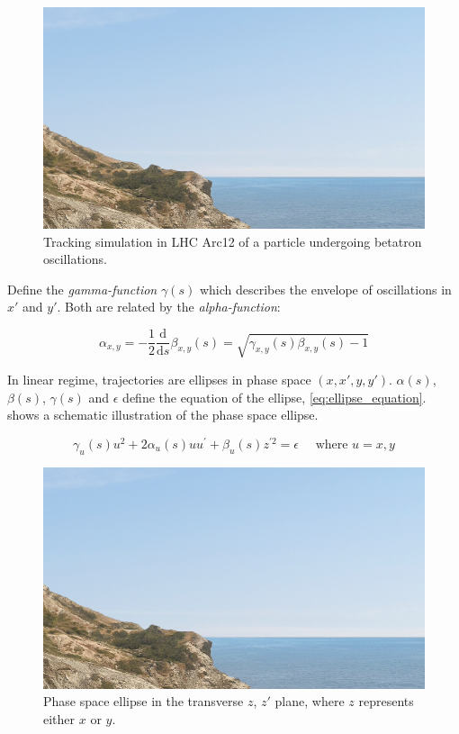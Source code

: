 \begin{figure}[!htb]
    \begin{center}
    \includegraphics[width = 0.7\linewidth]{Figures/placeholder.png}
    \caption{Tracking simulation in LHC Arc12 of a particle undergoing betatron oscillations.}
    \label{figure:particle_trajectories}
    \end{center}
\end{figure}

Define the \emph{gamma-function} $\gamma(s)$ which describes the envelope of oscillations in $x\prime$ and $y\prime$.
Both are related by the \emph{alpha-function}:
\bigbreak

\begin{equation}
    \alpha_{x, y} = -\frac{1}{2} \frac{\mathrm{d}}{\mathrm{d}s} \beta_{x, y}(s) = \sqrt{\gamma_{x, y}(s) \beta_{x, y}(s) - 1}
    \label{eq:alpha_function}
\end{equation}
\bigbreak

In linear regime, trajectories are ellipses in phase space $(x, x\prime, y, y\prime)$.
$\alpha(s)$, $\beta(s)$, $\gamma(s)$ and $\epsilon$ define the equation of the ellipse, \cref{eq:ellipse_equation}.
 shows a schematic illustration of the phase space ellipse.
\bigbreak

\begin{equation}
    \gamma_{u}(s) u^{2} + 2 \alpha_{u}(s) u u^{\prime} + \beta_{u}(s) z^{\prime 2} = \epsilon \quad \text { where } u = x, y
    \label{eq:ellipse_equation}
\end{equation}
\bigbreak

\begin{figure}[!htb]
    \begin{center}
    \includegraphics[width = 0.85\linewidth]{Figures/placeholder.png}
    \caption{Phase space ellipse in the transverse $z$, $z\prime$ plane, where $z$ represents either $x$ or $y$.}
    \label{figure:phase_space_ellipse}
    \end{center}
\end{figure}

